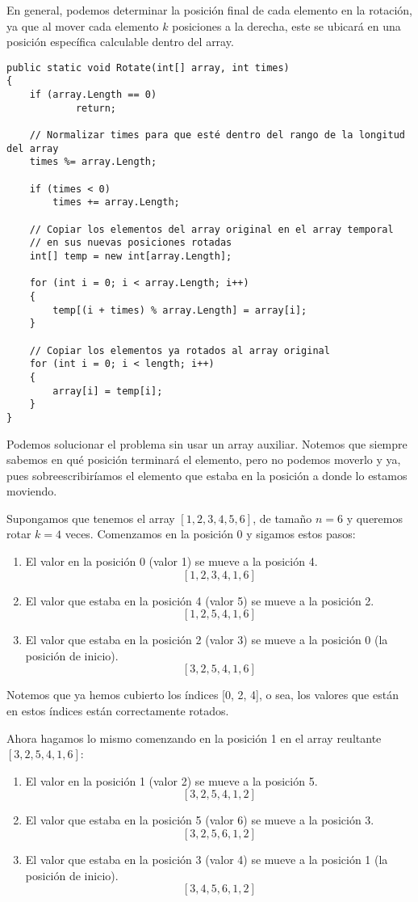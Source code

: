 En general, podemos determinar la posición final de cada elemento en la rotación, ya que al mover cada elemento $k$ posiciones a la derecha, este se ubicará en una posición específica calculable dentro del array. 

\begin{lstlisting}
public static void Rotate(int[] array, int times)
{
    if (array.Length == 0)
            return;
            
    // Normalizar times para que esté dentro del rango de la longitud del array
    times %= array.Length;

    if (times < 0)
        times += array.Length;
        
    // Copiar los elementos del array original en el array temporal
    // en sus nuevas posiciones rotadas
    int[] temp = new int[array.Length];

    for (int i = 0; i < array.Length; i++)
    {
        temp[(i + times) % array.Length] = array[i];
    }

    // Copiar los elementos ya rotados al array original
    for (int i = 0; i < length; i++)
    {
        array[i] = temp[i];
    }
}
\end{lstlisting}

Podemos solucionar el problema sin usar un array auxiliar. Notemos que siempre sabemos en qué posición terminará el elemento, pero no podemos moverlo y ya, pues sobreescribiríamos el elemento que estaba en la posición a donde lo estamos moviendo.

Supongamos que tenemos el array $[1, 2, 3, 4, 5, 6]$, de tamaño $n = 6$ y queremos rotar $k = 4$ veces. Comenzamos en la posición 0  y sigamos estos pasos:
\begin{enumerate}
    \item El valor en la posición 0 (valor 1) se mueve a la posición 4. 
    \[[1, 2, 3, 4, 1, 6]\]
    \item El valor que estaba en la posición 4 (valor 5) se mueve a la posición 2. 
    \[[1, 2, 5, 4, 1, 6]\]
    \item El valor que estaba en la posición 2 (valor 3) se mueve a la posición 0 (la posición de inicio). 
    \[[3, 2, 5, 4, 1, 6]\]
\end{enumerate}

Notemos que ya hemos cubierto los índices [0, 2, 4], o sea, los valores que están en estos índices están correctamente rotados.

Ahora hagamos lo mismo comenzando en la posición 1 en el array reultante $[3, 2, 5, 4, 1, 6]$:
\begin{enumerate}
    \item El valor en la posición 1 (valor 2) se mueve a la posición 5. 
    \[[3, 2, 5, 4, 1, 2]\]
    \item El valor que estaba en la posición 5 (valor 6) se mueve a la posición 3. 
    \[[3, 2, 5, 6, 1, 2]\]
    \item El valor que estaba en la posición 3 (valor 4) se mueve a la posición 1 (la posición de inicio). 
    \[[3, 4, 5, 6, 1, 2]\]
\end{enumerate}

